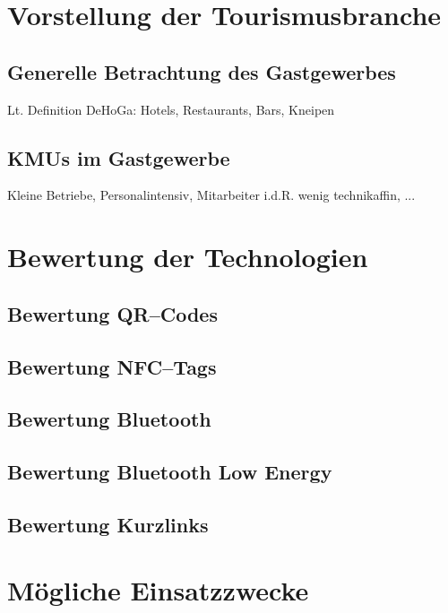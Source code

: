\section{Vorstellung der Tourismusbranche}
\label{sec:hauptteil}
\label{sec:tourismusbranche}

\subsection{Generelle Betrachtung des Gastgewerbes}
Lt. Definition DeHoGa: Hotels, Restaurants, Bars, Kneipen


\subsection{KMUs im Gastgewerbe}
Kleine Betriebe, Personalintensiv, Mitarbeiter i.d.R. wenig technikaffin, ...

\section{Bewertung der Technologien}
\label{sec:bewertung}

\subsection{Bewertung QR–Codes}
\subsection{Bewertung NFC--Tags}
\subsection{Bewertung Bluetooth}
\subsection{Bewertung Bluetooth Low Energy}
\subsection{Bewertung Kurzlinks}

\section{Mögliche Einsatzzwecke}
\label{sec:einsatzzwecke}

